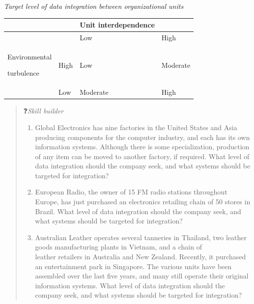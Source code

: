 \documentclass[
]{article}
\begin{document}
\emph{Target level of data integration between organizational units}

\begin{longtable}[]{@{}
  >{\raggedright\arraybackslash}p{}
  >{\raggedright\arraybackslash}p{}
  >{\raggedright\arraybackslash}p{}
  >{\raggedright\arraybackslash}p{}@{}}
\toprule
& & Unit interdependence & \\
\midrule
\endhead
& & Low & High \\
Environmental

turbulence & High & Low & Moderate \\
& Low & Moderate & High \\
\bottomrule
\end{longtable}

\begin{quote}
❓\emph{Skill builder}

\begin{enumerate}
\def\labelenumi{\arabic{enumi}.}
\item
  Global Electronics has nine factories in the United States and
  Asia producing components for the computer industry, and each has
  its own information systems. Although there is some
  specialization, production of any item can be moved to another
  factory, if required. What level of data integration should the
  company seek, and what systems should be targeted for integration?
\item
  European Radio, the owner of 15 FM radio stations throughout
  Europe, has just purchased an electronics retailing chain of 50
  stores in Brazil. What level of data integration should the
  company seek, and what systems should be targeted for integration?
\item
  Australian Leather operates several tanneries in Thailand, two
  leather goods manufacturing plants in Vietnam, and a chain of\\
  leather retailers in Australia and New Zealand. Recently, it
  purchased an entertainment park in Singapore. The various units
  have been assembled over the last five years, and many still
  operate their original information systems. What level of data
  integration should the company seek, and what systems should be
  targeted for integration?
\end{enumerate}
\end{quote}
\end{document}
